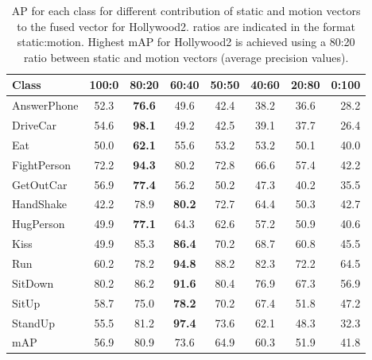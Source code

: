\begin{table}[]
\centering
\caption{AP for each class for different contribution of static and motion vectors to the fused vector for Hollywood2. ratios are indicated in the
format static:motion. Highest mAP for Hollywood2 is achieved using a
80:20 ratio between static and motion vectors (average precision values).}\label{tbl:rho hollywood2}
\begin{tabular}{@{} l c c c c c c r @{} }
\toprule
Class           & 100:0 & 80:20 & 60:40 & 50:50 & 40:60 & 20:80 & 0:100 \\ \midrule \midrule
AnswerPhone     & 52.3& \textbf{76.6}& 49.6& 42.4& 38.2& 36.6& 28.2        \\
DriveCar        & 54.6& \textbf{98.1}& 49.2& 42.5& 39.1& 37.7& 26.4            \\
Eat             & 50.0& \textbf{62.1}& 55.6& 53.2& 53.2& 50.1& 40.0           \\
FightPerson     & 72.2& \textbf{94.3}& 80.2& 72.8& 66.6& 57.4& 42.2  \\
GetOutCar       & 56.9& \textbf{77.4}& 56.2& 50.2& 47.3& 40.2& 35.5\\
HandShake       & 42.2& 78.9& \textbf{80.2}& 72.7& 64.4& 50.3& 42.7 \\
HugPerson       & 49.9& \textbf{77.1}& 64.3& 62.6& 57.2& 50.9& 40.6 \\
Kiss            & 49.9& 85.3& \textbf{86.4}& 70.2& 68.7& 60.8& 45.5 \\
Run             & 60.2& 78.2& \textbf{94.8}& 88.2& 82.3& 72.2& 64.5  \\
SitDown         & 80.2& 86.2& \textbf{91.6}& 80.4& 76.9& 67.3& 56.9  \\
SitUp           & 58.7& 75.0& \textbf{78.2}& 70.2& 67.4& 51.8& 47.2 \\
StandUp         & 55.5& 81.2& \textbf{97.4}& 73.6& 62.1& 48.3& 32.3 \\ \midrule
mAP             & 56.9& 80.9   &  73.6    &  64.9   &    60.3   &   51.9    &  41.8\\ \bottomrule

\end{tabular}
\end{table}

